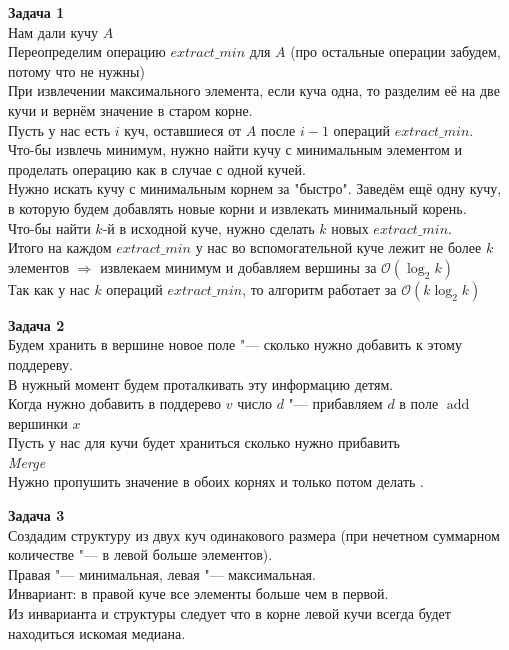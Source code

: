 \documentclass[14pt,a4paper,report]{ncc}
\begin{document}
\textbf{Задача 1}\\
Нам дали кучу $A$\\
Переопределим операцию $extract\_min$ для $A$ (про остальные операции забудем, потому что не нужны)\\
При извлечении максимального элемента, если куча одна, то разделим её на две кучи и вернём значение в старом корне.\\
Пусть у нас есть $i$ куч, оставшиеся от $A$ после $i-1$ операций $extract\_min$.\\
Что-бы извлечь минимум, нужно найти кучу с минимальным элементом и проделать операцию как в случае с одной кучей.\\
Нужно искать кучу с минимальным корнем за "быстро". Заведём ещё одну кучу, в которую будем добавлять новые корни и извлекать минимальный корень.\\
Что-бы найти $k$-й в исходной куче, нужно сделать $k$ новых $extract\_min$.\\
Итого на каждом $extract\_min$ у нас во вспомогательной куче лежит не более $k$ элементов $\Rightarrow$ извлекаем минимум и добавляем вершины за $\mathcal{O}(\log_2{k})$\\
Так как у нас $k$ операций $extract\_min$, то алгоритм работает за $\mathcal{O}(k\log_2{k})$

\textbf{Задача 2}\\
Будем хранить в вершине новое поле "--- сколько нужно добавить к этому поддереву.\\
В нужный момент будем проталкивать эту информацию детям.\\
Когда нужно добавить в поддерево $v$ число $d$ "--- прибавляем $d$ в поле $\operatorname{add}$ вершинки $x$\\
Пусть у нас для кучи будет храниться сколько нужно прибавить\\

\textit{Merge}\\
Нужно пропушить значение в обоих корнях и только потом делать .







\textbf{Задача 3}\\
Создадим структуру из двух куч одинакового размера (при нечетном суммарном количестве "--- в левой больше элементов).\\ Правая "--- минимальная, левая "--- максимальная.\\
Инвариант: в правой куче все элементы больше чем в первой.\\
Из инварианта и структуры следует что в корне левой кучи всегда будет находиться искомая медиана.\\
\end{document}
